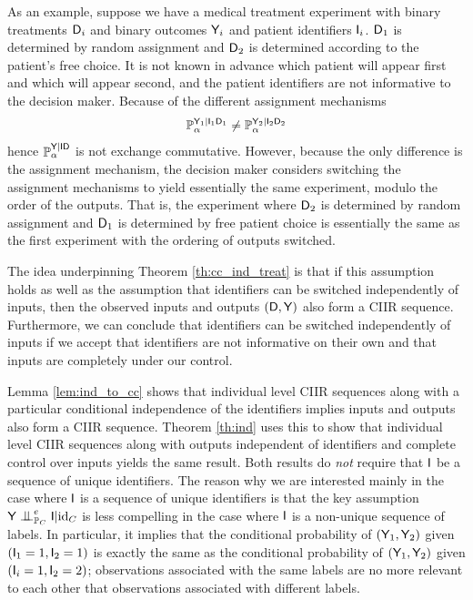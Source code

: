 As an example, suppose we have a medical treatment experiment with binary treatments $\mathsf{D}_i$ and binary outcomes $\mathsf{Y}_i$ and patient identifiers $\mathsf{I}_i$. $\mathsf{D}_1$ is determined by random assignment and $\mathsf{D}_2$ is determined according to the patient's free choice. It is not known in advance which patient will appear first and which will appear second, and the patient identifiers are not informative to the decision maker. Because of the different assignment mechanisms
\begin{align}
    \mathbb{P}_\alpha^{\mathsf{Y}_1|\mathsf{I}_1\mathsf{D}_1} \neq \mathbb{P}_\alpha^{\mathsf{Y}_2|\mathsf{I}_2\mathsf{D}_2}
\end{align}
hence $\mathbb{P}_\alpha^{\mathsf{Y}|\mathsf{ID}}$ is not exchange commutative. However, because the only difference is the assignment mechanism, the decision maker considers switching the assignment mechanisms to yield essentially the same experiment, modulo the order of the outputs. That is, the experiment where $\mathsf{D}_2$ is determined by random assignment and $\mathsf{D}_1$ is determined by free patient choice is essentially the same as the first experiment with the ordering of outputs switched.

The idea underpinning Theorem \ref{th:cc_ind_treat} is that if this assumption holds as well as the assumption that identifiers can be switched independently of inputs, then the observed inputs and outputs $(\mathsf{D},\mathsf{Y})$ also form a CIIR sequence. Furthermore, we can conclude that identifiers can be switched independently of inputs if we accept that identifiers are not informative on their own and that inputs are completely under our control.

Lemma \ref{lem:ind_to_cc} shows that individual level CIIR sequences along with a particular conditional independence of the identifiers implies inputs and outputs also form a CIIR sequence. Theorem \ref{th:ind} uses this to show that individual level CIIR sequences along with outputs independent of identifiers and complete control over inputs yields the same result. Both results do \emph{not} require that $\mathsf{I}$ be a sequence of unique identifiers. The reason why we are interested mainly in the case where $\mathsf{I}$ is a sequence of unique identifiers is that the key assumption $\RV{Y}\CI^e_{\prob{P}_C} \RV{I}|\text{id}_C$ is less compelling in the case where $\mathsf{I}$ is a non-unique sequence of labels. In particular, it implies that the conditional probability of $(\mathsf{Y}_1,\mathsf{Y}_2)$ given $(\mathsf{I}_1=1,\mathsf{I}_2=1)$ is exactly the same as the conditional probability of $(\mathsf{Y}_1,\mathsf{Y}_2)$ given $(\mathsf{I}_i=1,\mathsf{I}_2=2)$; observations associated with the same labels are no more relevant to each other that observations associated with different labels.


